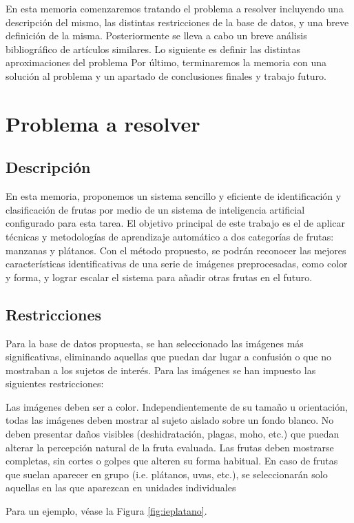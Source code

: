 \documentclass[a4paper, 12pt]{scrarticle}
\begin{document}
    En esta memoria comenzaremos tratando el problema a resolver incluyendo una descripción del mismo, las distintas restricciones de la base de datos, y una breve definición de la misma. Posteriormente se lleva a cabo un breve análisis bibliográfico de artículos similares. Lo siguiente es definir las distintas aproximaciones del problema %
    Por último, terminaremos la memoria con una solución al problema y un apartado de conclusiones finales y trabajo futuro.
    
\section{Problema a resolver}
\subsection{Descripción}

    En esta memoria, proponemos un sistema sencillo y eficiente de identificación y clasificación de frutas por medio de un sistema de inteligencia artificial configurado para esta tarea. El objetivo principal de este trabajo es el de aplicar técnicas y metodologías de aprendizaje automático a dos categorías de frutas: manzanas y plátanos. Con el método propuesto, se podrán reconocer las mejores características identificativas de una serie de imágenes preprocesadas, como color y forma, y lograr escalar el sistema para añadir otras frutas en el futuro.
    
\subsection{Restricciones}

    Para la base de datos propuesta, se han seleccionado las imágenes más significativas, eliminando aquellas que puedan dar lugar a confusión o que no mostraban a los sujetos de interés. Para las imágenes se han impuesto las siguientes restricciones:
    
    \begin{outline}
        \1 Las imágenes deben ser a color.
        \1 Independientemente de su tamaño u orientación, todas las imágenes deben mostrar al sujeto aislado sobre un fondo blanco.
        \1 No deben presentar daños visibles (deshidratación, plagas, moho, etc.) que puedan alterar la percepción natural de la fruta evaluada.
        \1 Las frutas deben mostrarse completas, sin cortes o golpes que alteren su forma habitual.
        \1 En caso de frutas que suelan aparecer en grupo (i.e. plátanos, uvas, etc.), se seleccionarán solo aquellas en las que aparezcan en unidades individuales
    \end{outline}
    Para un ejemplo, véase la Figura \ref{fig:ieplatano}.
    
\end{document}
